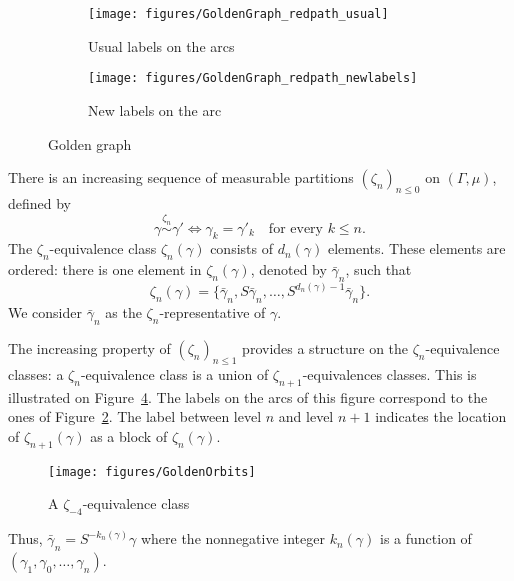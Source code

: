 \documentclass[12pt,a4paper]{article}
\begin{document}
\begin{figure}[!h]
   \centering
   \begin{subfigure}[t]{0.37\textwidth}
   \centering
   	\texttt{[image: figures/GoldenGraph\_redpath\_usual]}
 		\caption{\footnotesize Usual labels on the arcs}\label{fig:GoldenGraph}
    \end{subfigure}              
   \quad
    \begin{subfigure}[t]{0.37\textwidth}
    \centering
   	\texttt{[image: figures/GoldenGraph\_redpath\_newlabels]}
 		\caption{\footnotesize New labels on the arc}\label{fig:GoldenGraph_newlabs}
 	\end{subfigure}      

   \caption{Golden graph}
   \label{fig:ostro}
 \end{figure}

There is an increasing sequence of measurable partitions ${(\zeta_n)}_{n \leq 0}$ 
on $(\Gamma, \mu)$, defined by 
$$
\boxed{\gamma \overset{\zeta_n}{\sim} \gamma' 
\iff \gamma_k=\gamma'_k \quad\text{for every $k \leq n$}}.
$$ 
The $\zeta_n$-equivalence class $\zeta_n(\gamma)$ consists of $d_n(\gamma)$ elements. 
These elements are ordered: there is one element in $\zeta_n(\gamma)$, denoted by 
$\bar\gamma_n$, such that 
$$
\boxed{\zeta_n(\gamma)= \{\bar\gamma_n, S\bar\gamma_n, \ldots, S^{d_n(\gamma)-1}\bar\gamma_n\}}.
$$
We consider $\bar\gamma_n$ as the $\zeta_n$-representative of $\gamma$.



The increasing property of ${(\zeta_n)}_{n \leq 1}$ provides a structure 
on the $\zeta_{n}$-equivalence classes: a $\zeta_n$-equivalence class 
is a union of $\zeta_{n+1}$-equivalences classes. 
This is illustrated on Figure~\ref{fig:GoldenOrbits}. 
The labels on the arcs of this figure correspond to the ones of Figure~\ref{fig:GoldenGraph_newlabs}. 
The label between level $n$ and level $n+1$ indicates the location of 
$\zeta_{n+1}(\gamma)$ as a block of $\zeta_n(\gamma)$. 

\begin{figure}[!h]
\centering
\texttt{[image: figures/GoldenOrbits]}
\caption{A $\zeta_{-4}$-equivalence class}
\label{fig:GoldenOrbits}
\end{figure}

Thus, $\bar\gamma_n = S^{-k_n(\gamma)}\gamma$ where the nonnegative integer $k_n(\gamma)$ 
is a function of $(\gamma_{1}, \gamma_0, \ldots, \gamma_n)$. 
\end{document}
